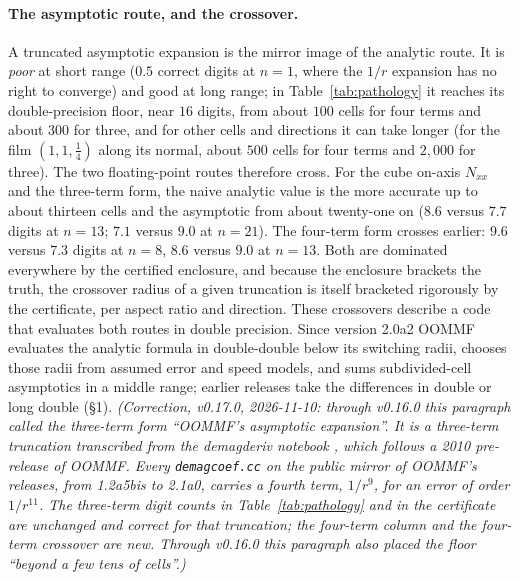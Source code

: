 \documentclass[11pt]{amsart}
\theoremstyle{plain}
\theoremstyle{definition}
\theoremstyle{remark}
\begin{document}
\paragraph{The asymptotic route, and the crossover.}
A truncated asymptotic expansion is the mirror image of the analytic route. It
is \emph{poor} at short range ($0.5$ correct digits at $n=1$, where the $1/r$
expansion has no right to converge) and good at long range; in
Table~\ref{tab:pathology} it reaches its double-precision floor, near $16$
digits, from about $100$ cells for four terms and about $300$ for three, and for
other cells and directions it can take longer (for the film $(1,1,\tfrac14)$
along its normal, about $500$ cells for four terms and $2{,}000$ for three). The two
floating-point routes therefore cross. For the cube on-axis $N_{xx}$ and the
three-term form, the naive analytic value is the more accurate up to about
thirteen cells and the asymptotic from about twenty-one on ($8.6$ versus $7.7$
digits at $n=13$; $7.1$ versus $9.0$ at $n=21$). The four-term form crosses
earlier: $9.6$ versus $7.3$ digits at $n=8$, $8.6$ versus $9.0$ at $n=13$. Both
are dominated everywhere by the certified enclosure, and because the enclosure
brackets the truth, the crossover radius of a given truncation is itself
bracketed rigorously by the certificate, per aspect ratio and direction. These
crossovers describe a code that evaluates both routes in double precision.
Since version 2.0a2 OOMMF evaluates the analytic formula in double-double below
its switching radii, chooses those radii from assumed error and speed models,
and sums subdivided-cell asymptotics in a middle range; earlier releases take the
differences in double or long double (\S1).
\emph{(Correction, v0.17.0, 2026-11-10: through v0.16.0 this paragraph called the
three-term form ``OOMMF's asymptotic expansion''. It is a three-term truncation
transcribed from the demagderiv notebook \cite{demagderiv}, which follows a 2010
pre-release of OOMMF. Every \texttt{demagcoef.cc} on the public mirror of OOMMF's
releases, from 1.2a5bis to 2.1a0, carries a fourth term, $1/r^{9}$, for an error
of order $1/r^{11}$. The three-term digit counts in Table~\ref{tab:pathology}
and in the certificate are unchanged and correct for that truncation; the
four-term column and the four-term crossover are new. Through v0.16.0 this
paragraph also placed the floor ``beyond a few tens of cells''.)}
\end{document}

